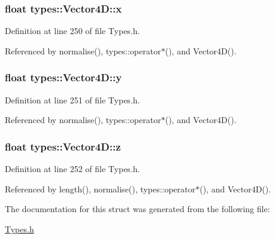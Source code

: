 \subsubsection[{x}]{\setlength{\rightskip}{0pt plus 5cm}float types\+::\+Vector4\+D\+::x}\label{structtypes_1_1_vector4_d_a00b1b79bf63dc9b91d3100bbceb8b061}


Definition at line 250 of file Types.\+h.



Referenced by normalise(), types\+::operator$\ast$(), and Vector4\+D().

\hypertarget{structtypes_1_1_vector4_d_ae3bf75e7f1e4430aecab11f181c53b61}{}
\subsubsection[{y}]{\setlength{\rightskip}{0pt plus 5cm}float types\+::\+Vector4\+D\+::y}\label{structtypes_1_1_vector4_d_ae3bf75e7f1e4430aecab11f181c53b61}


Definition at line 251 of file Types.\+h.



Referenced by normalise(), types\+::operator$\ast$(), and Vector4\+D().

\hypertarget{structtypes_1_1_vector4_d_a6384f3ff311fbdd2ed4e88d6ec548130}{}
\subsubsection[{z}]{\setlength{\rightskip}{0pt plus 5cm}float types\+::\+Vector4\+D\+::z}\label{structtypes_1_1_vector4_d_a6384f3ff311fbdd2ed4e88d6ec548130}


Definition at line 252 of file Types.\+h.



Referenced by length(), normalise(), types\+::operator$\ast$(), and Vector4\+D().



The documentation for this struct was generated from the following file\+:\begin{DoxyCompactItemize}
\item 
\hyperlink{_types_8h}{Types.\+h}\end{DoxyCompactItemize}
